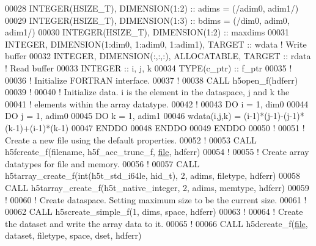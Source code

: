 \begin{DoxyCode}
00028   \textcolor{keywordtype}{INTEGER(HSIZE\_T)}, \textcolor{keywordtype}{DIMENSION(1:2)}   :: adims = (/adim0, adim1/)
00029   \textcolor{keywordtype}{INTEGER(HSIZE\_T)}, \textcolor{keywordtype}{DIMENSION(1:3)}   :: bdims = (/dim0, adim0, adim1/)
00030   \textcolor{keywordtype}{INTEGER(HSIZE\_T)}, \textcolor{keywordtype}{DIMENSION(1:2)}   :: maxdims
00031   \textcolor{keywordtype}{INTEGER}, \textcolor{keywordtype}{DIMENSION(1:dim0, 1:adim0, 1:adim1)}, \textcolor{keywordtype}{TARGET} :: wdata \textcolor{comment}{! Write buffer }
00032   \textcolor{keywordtype}{INTEGER}, \textcolor{keywordtype}{DIMENSION(:,:,:)}, \textcolor{keywordtype}{ALLOCATABLE}, \textcolor{keywordtype}{TARGET} :: rdata    \textcolor{comment}{! Read buffer}
00033   \textcolor{keywordtype}{INTEGER} :: i, j, k
00034   \textcolor{keywordtype}{TYPE}(c\_ptr) :: f\_ptr
00035   \textcolor{comment}{!}
00036   \textcolor{comment}{! Initialize FORTRAN interface.}
00037   \textcolor{comment}{!}
00038   \textcolor{keyword}{CALL }h5open\_f(hdferr)
00039   \textcolor{comment}{!}
00040   \textcolor{comment}{! Initialize data.  i is the element in the dataspace, j and k the}
00041   \textcolor{comment}{! elements within the array datatype.}
00042   \textcolor{comment}{!}
00043   \textcolor{keywordflow}{DO} i = 1, dim0
00044      \textcolor{keywordflow}{DO} j = 1, adim0
00045         \textcolor{keywordflow}{DO} k = 1, adim1
00046            wdata(i,j,k) = (i-1)*(j-1)-(j-1)*(k-1)+(i-1)*(k-1)
00047 \textcolor{keywordflow}{        ENDDO}
00048 \textcolor{keywordflow}{     ENDDO}
00049 \textcolor{keywordflow}{  ENDDO}
00050   \textcolor{comment}{!}
00051   \textcolor{comment}{! Create a new file using the default properties.}
00052   \textcolor{comment}{!}
00053   \textcolor{keyword}{CALL }h5fcreate\_f(filename, h5f\_acc\_trunc\_f, \hyperlink{structfile}{file}, hdferr)
00054   \textcolor{comment}{!}
00055   \textcolor{comment}{! Create array datatypes for file and memory.}
00056   \textcolor{comment}{!}
00057   \textcolor{keyword}{CALL }h5tarray\_create\_f(int(h5t\_std\_i64le, hid\_t), 2, adims, filetype, hdferr)
00058   \textcolor{keyword}{CALL }h5tarray\_create\_f(h5t\_native\_integer, 2, adims, memtype, hdferr)
00059   \textcolor{comment}{!}
00060   \textcolor{comment}{! Create dataspace.  Setting maximum size to be the current size.}
00061   \textcolor{comment}{!}
00062   \textcolor{keyword}{CALL }h5screate\_simple\_f(1, dims, space, hdferr)
00063   \textcolor{comment}{!}
00064   \textcolor{comment}{! Create the dataset and write the array data to it.}
00065   \textcolor{comment}{!}
00066   \textcolor{keyword}{CALL }h5dcreate\_f(\hyperlink{structfile}{file}, dataset, filetype, space, dset, hdferr)

\end{DoxyCode}
